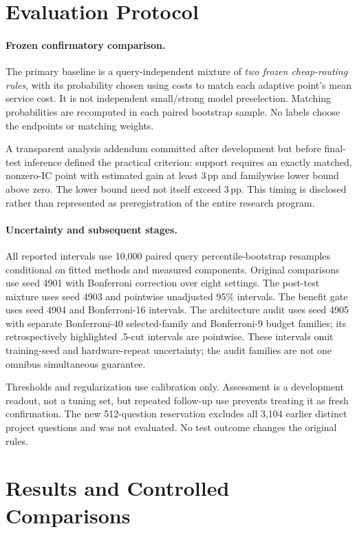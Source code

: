 \documentclass[11pt]{article}
\newcommand{\pp}{\,\text{pp}}
\begin{document}
\section{Evaluation Protocol}
\label{sec:eval}
\paragraph{Frozen confirmatory comparison.}
The primary baseline is a query-independent mixture of \emph{two frozen cheap-routing rules}, with its probability chosen using costs to match each adaptive point's mean service cost. It is not independent small/strong model preselection. Matching probabilities are recomputed in each paired bootstrap sample. No labels choose the endpoints or matching weights.

A transparent analysis addendum committed after development but before final-test inference defined the practical criterion: support requires an exactly matched, nonzero-IC point with estimated gain at least $3\pp$ and familywise lower bound above zero. The lower bound need not itself exceed $3\pp$. This timing is disclosed rather than represented as preregistration of the entire research program.

\paragraph{Uncertainty and subsequent stages.}
All reported intervals use 10,000 paired query percentile-bootstrap resamples conditional on fitted methods and measured components. Original comparisons use seed 4901 with Bonferroni correction over eight settings. The post-test mixture uses seed 4903 and pointwise unadjusted 95\% intervals. The benefit gate uses seed 4904 and Bonferroni-16 intervals. The architecture audit uses seed 4905 with separate Bonferroni-40 selected-family and Bonferroni-9 budget families; its retrospectively highlighted .5-cut intervals are pointwise. These intervals omit training-seed and hardware-repeat uncertainty; the audit families are not one omnibus simultaneous guarantee.

Thresholds and regularization use calibration only. Assessment is a development readout, not a tuning set, but repeated follow-up use prevents treating it as fresh confirmation. The new 512-question reservation excludes all 3,104 earlier distinct project questions and was not evaluated. No test outcome changes the original rules.

\section{Results and Controlled Comparisons}
\end{document}
